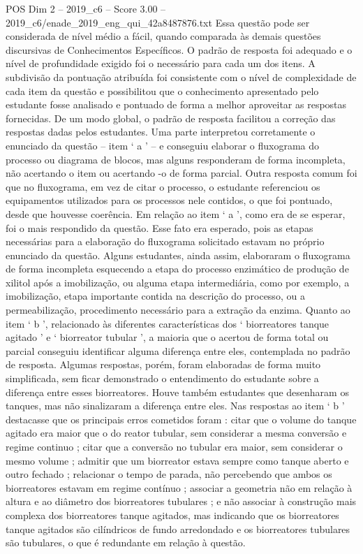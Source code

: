 \begin{textsample}{POS Dim 2 – 2019\_c6 – Score 3.00 – 2019\_c6/enade\_2019\_eng\_qui\_42a8487876.txt}
Essa questão pode ser considerada de nível médio a fácil, quando comparada às demais questões discursivas de Conhecimentos Específicos.
O padrão de resposta foi adequado e o nível de profundidade exigido foi o necessário para cada um dos itens.
A subdivisão da pontuação atribuída foi consistente com o nível de complexidade de cada item da questão e possibilitou que o conhecimento apresentado pelo estudante fosse analisado e pontuado de forma a melhor aproveitar as respostas fornecidas.
De um modo global, o padrão de resposta facilitou a correção das respostas dadas pelos estudantes.
Uma parte interpretou corretamente o enunciado da questão – item ‘ a ’ – e conseguiu elaborar o fluxograma do processo ou diagrama de blocos, mas alguns responderam de forma incompleta, não acertando o item ou acertando -o de forma parcial.
Outra resposta comum foi que no fluxograma, em vez de citar o processo, o estudante referenciou os equipamentos utilizados para os processos nele contidos, o que foi pontuado, desde que houvesse coerência.
Em relação ao item ‘ a ’, como era de se esperar, foi o mais respondido da questão.
Esse fato era esperado, pois as etapas necessárias para a elaboração do fluxograma solicitado estavam no próprio enunciado da questão.
Alguns estudantes, ainda assim, elaboraram o fluxograma de forma incompleta esquecendo a etapa do processo enzimático de produção de xilitol após a imobilização, ou alguma etapa intermediária, como por exemplo, a imobilização, etapa importante contida na descrição do processo, ou a permeabilização, procedimento necessário para a extração da enzima.
Quanto ao item ‘ b ’, relacionado às diferentes características dos ‘ biorreatores tanque agitado ’ e ‘ biorreator tubular ’, a maioria que o acertou de forma total ou parcial conseguiu identificar alguma diferença entre eles, contemplada no padrão de resposta.
Algumas respostas, porém, foram elaboradas de forma muito simplificada, sem ficar demonstrado o entendimento do estudante sobre a diferença entre esses biorreatores.
Houve também estudantes que desenharam os tanques, mas não sinalizaram a diferença entre eles.
Nas respostas ao item ‘ b ’ destacasse que os principais erros cometidos foram : citar que o volume do tanque agitado era maior que o do reator tubular, sem considerar a mesma conversão e regime continuo ; citar que a conversão no tubular era maior, sem considerar o mesmo volume ; admitir que um biorreator estava sempre como tanque aberto e outro fechado ; relacionar o tempo de parada, não percebendo que ambos os biorreatores estavam em regime contínuo ; associar a geometria não em relação à altura e ao diâmetro dos biorreatores tubulares ; e não associar à construção mais complexa dos biorreatores tanque agitados, mas indicando que os biorreatores tanque agitados são cilíndricos de fundo arredondado e os biorreatores tubulares são tubulares, o que é redundante em relação à questão.

\end{textsample}
